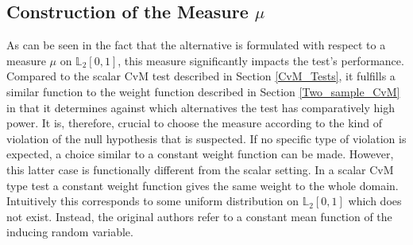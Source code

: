 \documentclass[12pt, a4paper]{article}
\theoremstyle{MAstyle} \newtheorem{assumption}{Assumption}[section]
\theoremstyle{MAstyle} \newtheorem{definition}{Definition}[section]
\theoremstyle{MAstyle} \newtheorem{theorem}{Theorem}[section]
\begin{document}
		\subsection{Construction of the Measure $\mu$}\label{mu}
			As can be seen in the fact that the alternative is formulated with respect to a measure $\mu$ on $\mathbb{L}_2[0,1]$, this measure significantly impacts the test's performance. Compared to the scalar CvM test described in Section \ref{CvM_Tests}, it fulfills a similar function to the weight function described in Section \ref{Two_sample_CvM} in that it determines against which alternatives the test has comparatively high power. It is, therefore, crucial to choose the measure according to the kind of violation of the null hypothesis that is suspected. If no specific type of violation is expected, a choice similar to a constant weight function can be made. However, this latter case is functionally different from the scalar setting. In a scalar  CvM type test a constant weight function gives the same weight to the whole domain. Intuitively this corresponds to some uniform distribution on $\mathbb{L}_2[0,1]$ which does not exist. Instead, the original authors refer to a constant mean function of the inducing random variable.
			
\end{document}
